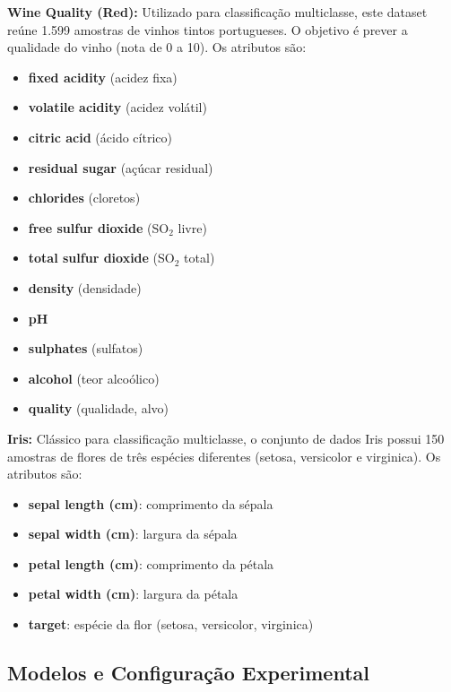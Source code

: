 \textbf{Wine Quality (Red):} Utilizado para classificação multiclasse, este dataset reúne 1.599 amostras de vinhos tintos portugueses. O objetivo é prever a qualidade do vinho (nota de 0 a 10). Os atributos são:
\begin{itemize}
    \item \textbf{fixed acidity} (acidez fixa)
    \item \textbf{volatile acidity} (acidez volátil)
    \item \textbf{citric acid} (ácido cítrico)
    \item \textbf{residual sugar} (açúcar residual)
    \item \textbf{chlorides} (cloretos)
    \item \textbf{free sulfur dioxide} (SO$_2$ livre)
    \item \textbf{total sulfur dioxide} (SO$_2$ total)
    \item \textbf{density} (densidade)
    \item \textbf{pH}
    \item \textbf{ sulphates} (sulfatos)
    \item \textbf{alcohol} (teor alcoólico)
    \item \textbf{quality} (qualidade, alvo)
\end{itemize}

\textbf{Iris:} Clássico para classificação multiclasse, o conjunto de dados Iris possui 150 amostras de flores de três espécies diferentes (setosa, versicolor e virginica). Os atributos são:
\begin{itemize}
    \item \textbf{sepal length (cm)}: comprimento da sépala
    \item \textbf{sepal width (cm)}: largura da sépala
    \item \textbf{petal length (cm)}: comprimento da pétala
    \item \textbf{petal width (cm)}: largura da pétala
    \item \textbf{target}: espécie da flor (setosa, versicolor, virginica)
\end{itemize}


\subsection{Modelos e Configuração Experimental}

